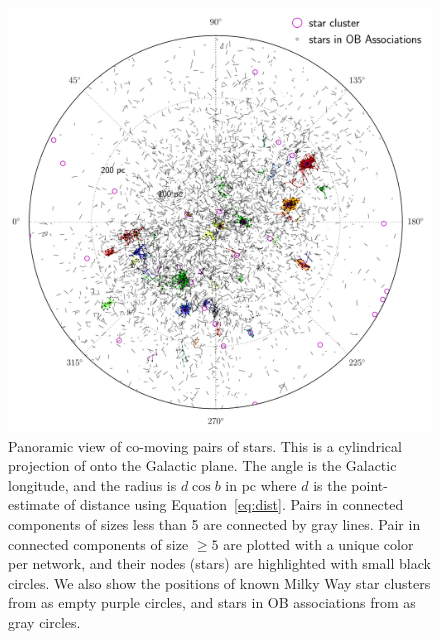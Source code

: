 \documentclass[manuscript, letterpaper]{aastex6}
\begin{document}
\begin{figure}[htbp]
  \begin{center}
    \includegraphics[width=\textwidth]{figures/glon_d_pie.pdf}
  \end{center}
  \caption{%
    Panoramic view of co-moving pairs of stars. This is a cylindrical
    projection of onto the Galactic plane. The angle is the Galactic
    longitude, and the radius is $d\cos b$ in pc where $d$ is the point-estimate
    of distance using Equation~\ref{eq:dist}.
    Pairs in connected components of sizes less than 5 are connected by gray lines.
    Pair in connected components of size $\geq 5$ are plotted with a unique color per network,
    and their nodes (stars) are highlighted with small black circles.
    We also show the positions of known Milky Way star clusters
    from \citet{Kharchenko:2016aa} as empty purple circles,
    and stars in OB associations from \citet{de-Zeeuw:1999aa} as
    gray circles.
    \label{fig:glon_d_pairlines}}
\end{figure}
\end{document}
